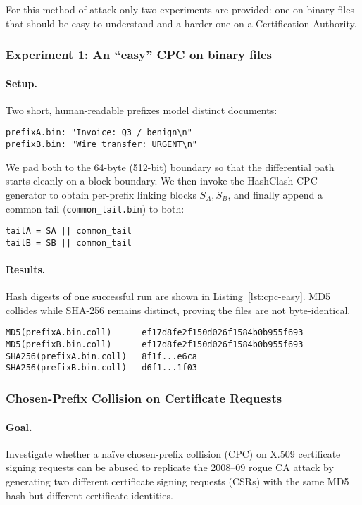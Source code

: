 \documentclass[runningheads]{llncs}
\begin{document}
    For this method of attack only two experiments are provided: one on binary files that should be easy to understand and a harder one on a Certification Authority.

    \subsubsection{Experiment 1: An ``easy'' CPC on binary files}\label{par:CPC-easy}
    \paragraph{Setup.}
    Two short, human-readable prefixes model distinct documents:
    \begin{lstlisting}[style=textblock]
prefixA.bin: "Invoice: Q3 / benign\n"
prefixB.bin: "Wire transfer: URGENT\n"
    \end{lstlisting}
    We pad both to the 64-byte (512-bit) boundary so that the differential path starts cleanly on a block boundary. We then invoke the HashClash CPC generator to obtain per-prefix linking blocks \(S_A,S_B\), and finally append a common tail (\texttt{common\_tail.bin}) to both:
    \begin{lstlisting}[style=textblock]
tailA = SA || common_tail
tailB = SB || common_tail
    \end{lstlisting}

    \paragraph{Results.}
    Hash digests of one successful run are shown in Listing~\ref{lst:cpc-easy}. MD5 collides while SHA-256 remains distinct, proving the files are not byte-identical.

    \begin{lstlisting}[style=hashblock,caption={MD5/SHA-256 of the collided pair},label={lst:cpc-easy}]
MD5(prefixA.bin.coll)      ef17d8fe2f150d026f1584b0b955f693
MD5(prefixB.bin.coll)      ef17d8fe2f150d026f1584b0b955f693
SHA256(prefixA.bin.coll)   8f1f...e6ca
SHA256(prefixB.bin.coll)   d6f1...1f03
    \end{lstlisting}

    \subsubsection{Chosen-Prefix Collision on Certificate Requests}
    \paragraph{Goal.} Investigate whether a naïve chosen-prefix collision (CPC) on X.509 certificate signing requests can be abused to replicate the 2008–09 rogue CA attack \cite{stevens2009crypto} by generating two different certificate signing requests (CSRs) with the same MD5 hash but different certificate identities.
\end{document}
